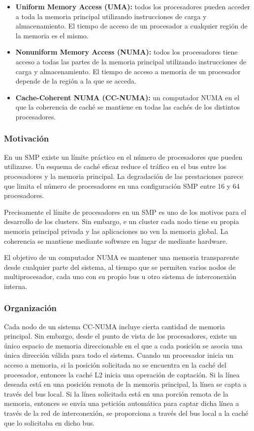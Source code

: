 \begin{itemize}
  \item \textbf{Uniform Memory Access (UMA):} todos los procesadores pueden acceder a toda la memoria principal utilizando instrucciones de carga y almacenamiento. El tiempo de acceso de un procesador a cualquier región de la memoria es el mismo.
  \item \textbf{Nonuniform Memory Access (NUMA):} todos los procesadores tiene acceso a todas las partes de la memoria principal utilizando instrucciones de carga y almacenamiento. El tiempo de acceso a memoria de un procesador depende de la región a la que se acceda.   
  \item \textbf{Cache-Coherent NUMA (CC-NUMA):} un computador NUMA en el que la coherencia de caché se mantiene en todas las cachés de los distintos procesadores.
\end{itemize}

\subsubsection*{Motivación}

En un SMP existe un límite práctico en el número de procesadores que pueden utilizarse. Un esquema de caché eficaz reduce el tráfico en el bus entre los procesadores y la memoria principal. La degradación de las prestaciones parece que limita el número de procesadores en una configuración SMP entre 16 y 64 procesadores.

Precisamente el límite de procesadores en un SMP es uno de los motivos para el desarrollo de los clusters. Sin embargo, e un cluster cada nodo tiene su propia memoria principal privada y las aplicaciones no ven la memoria global. La coherencia se mantiene mediante software en lugar de mediante hardware.

El objetivo de un computador NUMA es mantener una memoria transparente desde cualquier parte del sistema, al tiempo que se permiten varios nodos de multiprocesador, cada uno con su propio bus u otro sistema de interconexión interna.

\subsubsection*{Organización}

Cada nodo de un sistema CC-NUMA incluye cierta cantidad de memoria principal. Sin embargo, desde el punto de vista de los procesadores, existe un único espacio de memoria direccionable en el que a cada posición se asocia una única dirección válida para todo el sistema. Cuando un procesador inicia un acceso a memoria, si la posición solicitada no se encuentra en la caché del procesador, entonces la caché L2 inicia una operación de captación. Si la línea deseada está en una posición remota de la memoria principal, la línea se capta a través del bus local. Si la línea solicitada está en una porción remota de la memoria, entonces se envía una petición automática para captar dicha línea a través de la red de interconexión, se proporciona a través del bus local a la caché que lo solicitaba en dicho bus.

